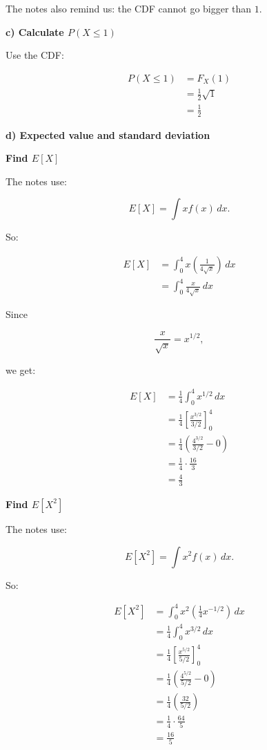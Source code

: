 \documentclass[10pt]{article}
\begin{document}
The notes also remind us:
the CDF cannot go bigger than $1$.

\textbf{c) Calculate $P(X\leq 1)$}

Use the CDF:

\begin{align*}
P(X\leq 1)
&=
F_X(1) \\[2mm]
&=
\frac{1}{2}\sqrt{1} \\[2mm]
&=
\frac{1}{2}
\end{align*}

\textbf{d) Expected value and standard deviation}

\textbf{Find $E[X]$}

The notes use:

\[
E[X]=\int x f(x)\,dx.
\]

So:

\begin{align*}
E[X]
&=
\int_0^4
x\left(\frac{1}{4\sqrt{x}}\right)\,dx \\[2mm]
&=
\int_0^4
\frac{x}{4\sqrt{x}}\,dx
\end{align*}

Since

\[
\frac{x}{\sqrt{x}}=x^{1/2},
\]

we get:

\begin{align*}
E[X]
&=
\frac{1}{4}
\int_0^4 x^{1/2}\,dx \\[2mm]
&=
\frac{1}{4}
\left[
\frac{x^{3/2}}{3/2}
\right]_0^4 \\[2mm]
&=
\frac{1}{4}
\left(
\frac{4^{3/2}}{3/2}-0
\right) \\[2mm]
&=
\frac{1}{4}\cdot \frac{16}{3} \\[2mm]
&=
\frac{4}{3}
\end{align*}

\textbf{Find $E[X^2]$}

The notes use:

\[
E[X^2]
=
\int x^2 f(x)\,dx.
\]

So:

\begin{align*}
E[X^2]
&=
\int_0^4
x^2\left(\frac{1}{4}x^{-1/2}\right)\,dx \\[2mm]
&=
\frac{1}{4}
\int_0^4
x^{3/2}\,dx \\[2mm]
&=
\frac{1}{4}
\left[
\frac{x^{5/2}}{5/2}
\right]_0^4 \\[2mm]
&=
\frac{1}{4}
\left(
\frac{4^{5/2}}{5/2}
-0
\right) \\[2mm]
&=
\frac{1}{4}
\left(
\frac{32}{5/2}
\right) \\[2mm]
&=
\frac{1}{4}\cdot \frac{64}{5} \\[2mm]
&=
\frac{16}{5}
\end{align*}
\end{document}
